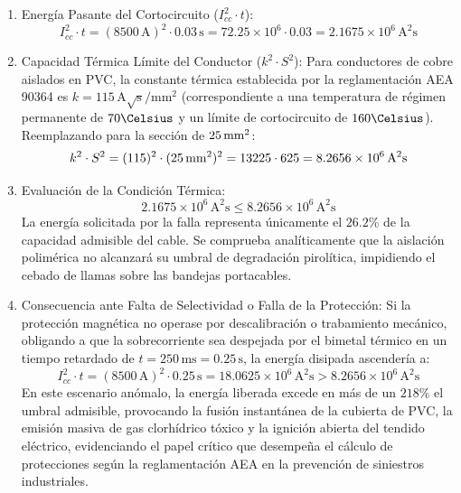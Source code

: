 \begin{enumerate}
    \item Energía Pasante del Cortocircuito ($I_{cc}^2 \cdot t$):
          \begin{equation}
          I_{cc}^2 \cdot t = (8500\,\mathrm{A})^2 \cdot 0.03\,\mathrm{s} = 72.25 \times 10^6 \cdot 0.03 = 2.1675 \times 10^6\,\mathrm{A^2 s}
          \end{equation}
    \item Capacidad Térmica Límite del Conductor ($k^2 \cdot S^2$):
          Para conductores de cobre aislados en PVC, la constante térmica establecida por la reglamentación AEA 90364 es
          $k = 115\,\mathrm{A\sqrt{s}/mm^2}$ (correspondiente a una temperatura de régimen permanente de $70\Celsius$ y un
          límite de cortocircuito de $160\Celsius$). Reemplazando para la sección de $25\,\mathrm{mm}^2$:
          \begin{equation}
          k^2 \cdot S^2 = (115)^2 \cdot (25\,\mathrm{mm}^2)^2 = 13225 \cdot 625 = 8.2656 \times 10^6\,\mathrm{A^2 s}
          \end{equation}
    \item Evaluación de la Condición Térmica:
          \begin{equation}
          2.1675 \times 10^6\,\mathrm{A^2 s} \le 8.2656 \times 10^6\,\mathrm{A^2 s}
          \end{equation}
          La energía solicitada por la falla representa únicamente el $26.2\percent$ de la capacidad admisible del cable. Se
          comprueba analíticamente que la aislación polimérica no alcanzará su umbral de degradación pirolítica, impidiendo
          el cebado de llamas sobre las bandejas portacables.
    \item Consecuencia ante Falta de Selectividad o Falla de la Protección:
          Si la protección magnética no operase por descalibración o trabamiento mecánico, obligando a que la sobrecorriente
          sea despejada por el bimetal térmico en un tiempo retardado de $t = 250\,\mathrm{ms} = 0.25\,\mathrm{s}$, la
          energía disipada ascendería a:
          \begin{equation}
          I_{cc}^2 \cdot t = (8500\,\mathrm{A})^2 \cdot 0.25\,\mathrm{s} = 18.0625 \times 10^6\,\mathrm{A^2 s} > 8.2656 \times 10^6\,\mathrm{A^2 s}
          \end{equation}
          En este escenario anómalo, la energía liberada excede en más de un $218\percent$ el umbral admisible, provocando la
          fusión instantánea de la cubierta de PVC, la emisión masiva de gas clorhídrico tóxico y la ignición abierta del
          tendido eléctrico, evidenciando el papel crítico que desempeña el cálculo de protecciones según la reglamentación
          AEA en la prevención de siniestros industriales.
\end{enumerate}


